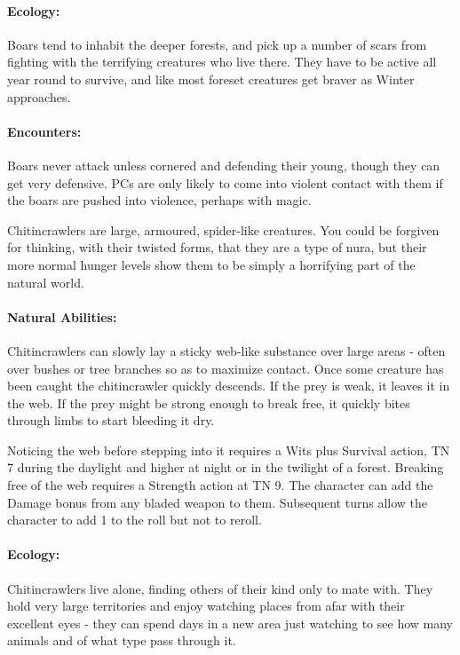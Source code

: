 \begin{multicols}{2}
\label{boar}
\boar

\paragraph{Ecology:} Boars tend to inhabit the deeper forests, and pick up a number of scars from fighting with the terrifying creatures who live there.  They have to be active all year round to survive, and like most foreset creatures get braver as Winter approaches.

\paragraph{Encounters:} Boars never attack unless cornered and defending their young, though they can get very defensive.  PCs are only likely to come into violent contact with them if the boars are pushed into violence, perhaps with magic.

\label{chitincrawler}
\chitincrawler

Chitincrawlers are large, armoured, spider-like creatures.  You could be forgiven for thinking, with their twisted forms, that they are a type of nura, but their more normal hunger levels show them to be simply a horrifying part of the natural world.

\paragraph{Natural Abilities:} Chitincrawlers can slowly lay a sticky web-like substance over large areas - often over bushes or tree branches so as to maximize contact.  Once some creature has been caught the chitincrawler quickly descends.  If the prey is weak, it leaves it in the web.  If the prey might be strong enough to break free, it quickly bites through limbs to start bleeding it dry.

Noticing the web before stepping into it requires a Wits plus Survival action, TN 7 during the daylight and higher at night or in the twilight of a forest.  Breaking free of the web requires a Strength action at TN 9.  The character can add the Damage bonus from any bladed weapon to them.  Subsequent turns allow the character to add 1 to the roll but not to reroll.

\paragraph{Ecology:} Chitincrawlers live alone, finding others of their kind only to mate with.  They hold very large territories and enjoy watching places from afar with their excellent eyes - they can spend days in a new area just watching to see how many animals and of what type pass through it.


\end{multicols}
